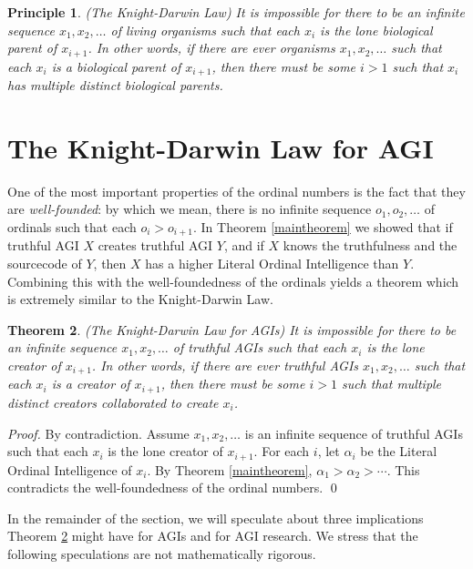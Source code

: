 \documentclass[runningheads]{llncs}
\newtheorem{mytheorem}{Theorem}
\newtheorem{myprinciple}[mytheorem]{Principle}
\begin{document}
\begin{myprinciple}
(The Knight-Darwin Law)
It is impossible for there to be an infinite sequence
$x_1,x_2,\ldots$ of living organisms such that each $x_i$
is the lone biological parent of $x_{i+1}$. In other words,
if there are ever organisms $x_1,x_2,\ldots$ such that each
$x_i$ is a biological parent of $x_{i+1}$, then there must
be some $i>1$ such that $x_i$ has multiple distinct biological
parents.
\end{myprinciple}


\section{The Knight-Darwin Law for AGI}
\label{knightdarwinagisection}

One of the most important properties of the ordinal numbers is the
fact that they are \emph{well-founded}: by which we mean, there is
no infinite sequence $o_1,o_2,\ldots$ of ordinals such that each
$o_i>o_{i+1}$. In Theorem \ref{maintheorem} we showed that if truthful
AGI $X$ creates truthful AGI $Y$, and if $X$ knows the truthfulness
and the sourcecode of $Y$, then $X$ has a higher Literal Ordinal Intelligence
than $Y$. Combining this with the well-foundedness of the ordinals yields
a theorem which is extremely similar to the Knight-Darwin Law.

\begin{mytheorem}
\label{maintheorem2}
(The Knight-Darwin Law for AGIs)
It is impossible for there to be an infinite sequence
$x_1,x_2,\ldots$ of truthful AGIs such that each $x_i$ is the lone creator of $x_{i+1}$.
In other words, if there are
ever truthful AGIs $x_1,x_2,\ldots$ such that each $x_i$ is a creator of $x_{i+1}$,
then there must be some $i>1$ such that multiple distinct creators collaborated to
create $x_i$.
\end{mytheorem}

\begin{proof}
By contradiction. Assume $x_1,x_2,\ldots$ is an infinite sequence of truthful AGIs such
that each $x_i$ is the lone creator of $x_{i+1}$. For each $i$, let $\alpha_i$
be the Literal Ordinal Intelligence of $x_i$. By Theorem \ref{maintheorem},
$\alpha_1>\alpha_2>\cdots$. This contradicts the well-foundedness of the ordinal
numbers.
\qed
\end{proof}

In the remainder of the section, we will speculate about three implications
Theorem \ref{maintheorem2} might have for AGIs and for AGI research.
We stress that the following speculations are not mathematically rigorous.
\end{document}
